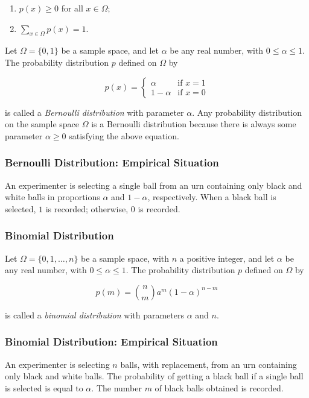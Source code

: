 \documentclass[12pt]{article}
\begin{document}
\begin{enumerate}
\item $p(x) \geq 0$ for all $x \in \Omega$;
\item $\sum_{x \in \Omega} p(x) = 1$.
\end{enumerate}

\noindent
Let $\Omega = \{ 0,1 \}$ be a sample space, and let $\alpha$ be any real number, with $0 \leq \alpha \leq 1$. The probability distribution $p$ defined on $\Omega$ by 

\begin{equation*}
p(x) =  \begin{cases} 
      \alpha & \text{if } x = 1 \\
      1-\alpha & \text{if } x = 0
      \end{cases}
\end{equation*}

\noindent
is called a \textit{Bernoulli distribution} with parameter $\alpha$. Any probability distribution on the sample space $\Omega$ is a Bernoulli distribution because there is always some parameter $\alpha \geq 0$ satisfying the above equation. 

\subsubsection*{Bernoulli Distribution: Empirical Situation}
\noindent
An experimenter is selecting a single ball from an urn containing only black and white balls in proportions $\alpha$ and $1-\alpha$, respectively. When a black ball is selected, $1$ is recorded; otherwise, $0$ is recorded.

\subsubsection*{Binomial Distribution}
Let $\Omega = \{ 0, 1, \ldots, n \}$ be a sample space, with $n$ a positive integer, and let $\alpha$ be any real number, with $0 \leq \alpha \leq 1$. The probability distribution $p$ defined on $\Omega$ by

\begin{equation*}
p(m) = {n \choose m} a^m (1 - \alpha)^{n-m}
\end{equation*}

\noindent
is called a \textit{binomial distribution} with parameters $\alpha$ and $n$.

\subsubsection*{Binomial Distribution: Empirical Situation}
\noindent
An experimenter is selecting $n$ balls, with replacement, from an urn containing only black and white balls. The probability of getting a black ball if a single ball is selected is equal to $\alpha$. The number $m$ of black balls obtained is recorded.
\end{document}
